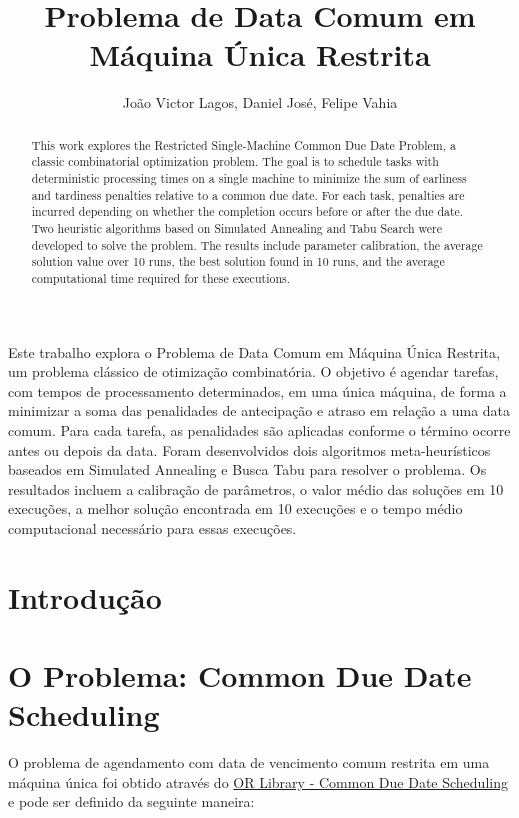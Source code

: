 \documentclass[12pt]{article}
\title{Problema de Data Comum em Máquina Única Restrita}
\author{João Victor Lagos\inst{1}, Daniel José\inst{1}, Felipe Vahia\inst{1}}
\begin{document}
 

\maketitle
     
\begin{resumo} 
Este trabalho explora o Problema de Data Comum em Máquina Única Restrita, um problema clássico de otimização combinatória. O objetivo é agendar tarefas, com tempos de processamento determinados, em uma única máquina, de forma a minimizar a soma das penalidades de antecipação e atraso em relação a uma data comum. Para cada tarefa, as penalidades são aplicadas conforme o término ocorre antes ou depois da data. Foram desenvolvidos dois algoritmos meta-heurísticos baseados em Simulated Annealing e Busca Tabu para resolver o problema. Os resultados incluem a calibração de parâmetros, o valor médio das soluções em 10 execuções, a melhor solução encontrada em 10 execuções e o tempo médio computacional necessário para essas execuções.
\end{resumo}

\begin{abstract}  
This work explores the Restricted Single-Machine Common Due Date Problem, a classic combinatorial optimization problem. The goal is to schedule tasks with deterministic processing times on a single machine to minimize the sum of earliness and tardiness penalties relative to a common due date. For each task, penalties are incurred depending on whether the completion occurs before or after the due date. Two heuristic algorithms based on Simulated Annealing and Tabu Search were developed to solve the problem. The results include parameter calibration, the average solution value over 10 runs, the best solution found in 10 runs, and the average computational time required for these executions.  
\end{abstract}



\section{Introdução}

\section{O Problema: Common Due Date Scheduling} \label{sec:o_problema}

O problema de agendamento com data de vencimento comum restrita em uma máquina única foi obtido através do \href{https://people.brunel.ac.uk/~mastjjb/jeb/orlib/schinfo.html}{OR Library - Common Due Date Scheduling} e pode ser definido da seguinte maneira:
\end{document}
